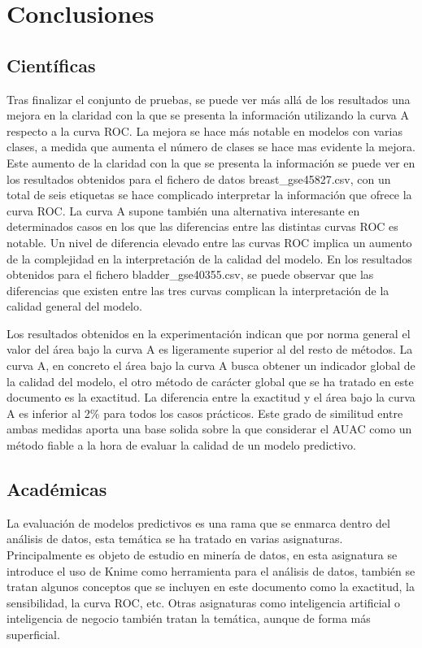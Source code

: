 \section{Conclusiones}

\subsection{Científicas}

Tras finalizar el conjunto de pruebas, se puede ver más allá de los resultados una mejora en la claridad con la que se presenta la información utilizando la curva A respecto a la curva ROC. La mejora se hace más notable en modelos con varias clases, a medida que aumenta el número de clases se hace mas evidente la mejora. Este aumento de la claridad con la que se presenta la información se puede ver en los resultados obtenidos para el fichero de datos breast\_gse45827.csv, con un total de seis etiquetas se hace complicado interpretar la información que ofrece la curva ROC. La curva A supone también una alternativa interesante en determinados casos en los que las diferencias entre las distintas curvas ROC es notable. Un nivel de diferencia elevado entre las curvas ROC implica un aumento de la complejidad en la interpretación de la calidad del modelo. En los resultados obtenidos para el fichero bladder\_gse40355.csv, se puede observar que las diferencias que existen entre las tres curvas complican la interpretación de la calidad general del modelo.

\bigbreak

Los resultados obtenidos en la experimentación indican que por norma general el valor del área bajo la curva A es ligeramente superior al del resto de métodos. La curva A, en concreto el área bajo la curva A busca obtener un indicador global de la calidad del modelo, el otro método de carácter global que se ha tratado en este documento es la exactitud. La diferencia entre la exactitud y el área bajo la curva A es inferior al 2\% para todos los casos prácticos. Este grado de similitud entre ambas medidas aporta una base solida sobre la que considerar el AUAC como un método fiable a la hora de evaluar la calidad de un modelo predictivo.

\subsection{Académicas}

La evaluación de modelos predictivos es una rama que se enmarca dentro del análisis de datos, esta temática se ha tratado en varias asignaturas. Principalmente es objeto de estudio en minería de datos, en esta asignatura se introduce el uso de Knime como herramienta para el análisis de datos, también se tratan algunos conceptos que se incluyen en este documento como la exactitud, la sensibilidad, la curva ROC, etc. Otras asignaturas como inteligencia artificial o inteligencia de negocio también tratan la temática, aunque de forma más superficial.

